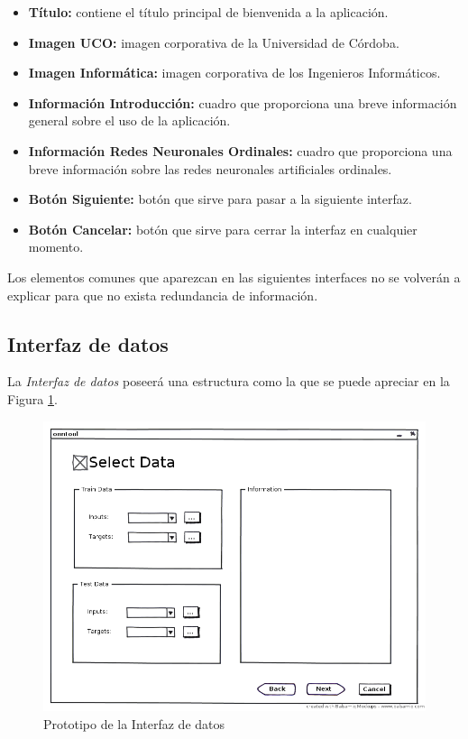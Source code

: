 			\begin{itemize}
				\item \textbf{Título:} contiene el título principal de bienvenida a la aplicación.
				\item \textbf{Imagen UCO:} imagen corporativa de la Universidad de Córdoba.
				\item \textbf{Imagen Informática:} imagen corporativa de los Ingenieros Informáticos.
				\item \textbf{Información Introducción:} cuadro que proporciona una breve información general sobre el uso de la aplicación.
				\item \textbf{Información Redes Neuronales Ordinales:} cuadro que proporciona una breve información sobre las redes neuronales artificiales ordinales.
				\item \textbf{Botón Siguiente:} botón que sirve para pasar a la siguiente interfaz.
				\item \textbf{Botón Cancelar:} botón que sirve para cerrar la interfaz en cualquier momento.
			\end{itemize}
			
			Los elementos comunes que aparezcan en las siguientes interfaces no se volverán a explicar para que no exista redundancia de información.
		
		\subsection{Interfaz de datos}
		
			La \textit{Interfaz de datos} poseerá una estructura como la que se puede apreciar en la Figura \ref{fig:int1}.\\
			
			\begin{figure}[htbp]
				\centering
				\includegraphics[scale=0.5]{interfaz/Interfaz_datos.png}
				\caption{Prototipo de la Interfaz de datos}
				\label{fig:int1}
			\end{figure}
			
